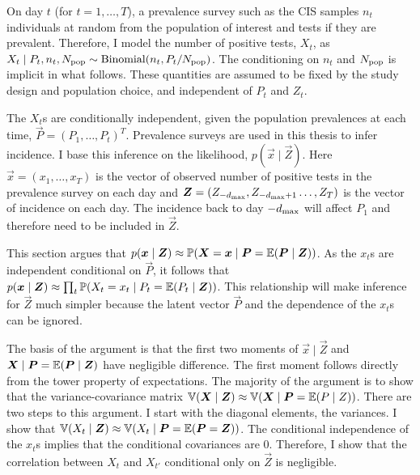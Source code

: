 \documentclass[thesis.tex]{subfiles}
\begin{document}
On day $t$ (for $t = 1, \dots, T$), a prevalence survey such as the CIS samples $n_t$ individuals at random from the population of interest and tests if they are prevalent.
Therefore, I model the number of positive tests, $X_t$, as $X_t \mid P_t, n_t, N_\text{pop} \sim \operatorname{Binomial}(n_t, P_t/N_\text{pop})$.
The conditioning on $n_t$ and $N_\text{pop}$ is implicit in what follows.
These quantities are assumed to be fixed by the study design and population choice, and independent of $P_t$ and $Z_t$.

The $X_t$s are conditionally independent, given the population prevalences at each time, $\vec{P} = (P_1, \dots, P_t)^T$. 
Prevalence surveys are used in this thesis to infer incidence.
I base this inference on the likelihood, $p(\vec{x} \mid \vec{Z})$.%
Here $\vec{x} = (x_1, \dots, x_T)$ is the vector of observed number of positive tests in the prevalence survey on each day and $\bm{Z} = (Z_{-d_\text{max}}, Z_{-d_\text{max}+1} \dots, Z_T)$ is the vector of incidence on each day.
The incidence back to day $-d_\text{max}$ will affect $P_1$ and therefore need to be included in $\vec{Z}$. 

This section argues that $p(\bm{x} \mid \bm{Z}) \approx \operatorname{\mathbb{P}}(\bm{X} = \bm{x} \mid \bm{P} = \operatorname{\mathbb{E}}(\bm{P} \mid \bm{Z}))$.
As the $x_t$s are independent conditional on $\vec{P}$, it follows that $p(\bm{x} \mid \bm{Z}) \approx \prod_t \operatorname{\mathbb{P}}(X_t = x_t \mid P_t = \operatorname{\mathbb{E}}(P_t \mid \bm{Z}))$.
This relationship will make inference for $\vec{Z}$ much simpler because the latent vector $\vec{P}$ and the dependence of the $x_t$s can be ignored.

The basis of the argument is that the first two moments of $\vec{x} \mid \vec{Z}$ and $\bm{X} \mid \bm{P} = \operatorname{\mathbb{E}}(\bm{P} \mid \bm{Z})$ have negligible difference.
The first moment follows directly from the tower property of expectations.
The majority of the argument is to show that the variance-covariance matrix $\operatorname{\mathbb{V}}(\bm{X} \mid \bm{Z}) \approx \operatorname{\mathbb{V}}(\bm{X} \mid \bm{P} = \operatorname{\mathbb{E}}(P \mid Z))$.
There are two steps to this argument.
I start with the diagonal elements, the variances.
I show that $\operatorname{\mathbb{V}}(X_t \mid \bm{Z}) \approx \operatorname{\mathbb{V}}(X_t \mid \bm{P} = \operatorname{\mathbb{E}}(\bm{P} = \bm{Z}))$.
The conditional independence of the $x_t$s implies that the conditional covariances are 0.
Therefore, I show that the correlation between $X_t$ and $X_{t'}$ conditional only on $\vec{Z}$ is negligible.
\end{document}
